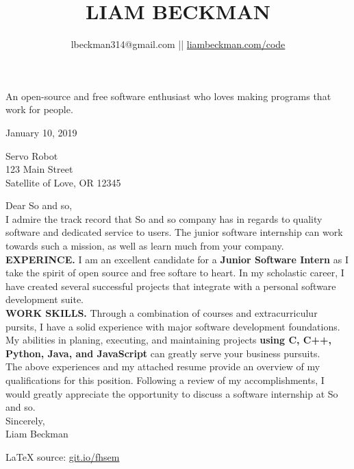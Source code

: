 \documentclass[a4paper]{article}
\title{\textcolor{my-red}{LIAM BECKMAN}}
\author{lbeckman314@gmail.com || \href{https://liambeckman.com/code}{liambeckman.com/code}}
\date{\vspace{-5ex}}
\begin{document}
\maketitle

\begin{center}
An open-source and free software enthusiast who loves making programs that work for people.
\end{center}

\textcolor{my-grey}{\dotfill}
\bigbreak

January 10, 2019\\
\bigbreak

Servo Robot\\
123 Main Street\\
Satellite of Love, OR 12345\\

\bigbreak

Dear So and so,\\

I admire the track record that So and so company has in regards to quality software and dedicated service to users. The junior software internship can work towards such a mission, as well as learn much from your company.\\

\textbf{EXPERINCE.} I am an excellent candidate for a \textbf{Junior Software Intern} as I take the spirit of open source and free softare to heart. In my scholastic career, I have created several successful projects that integrate with a personal software development suite.\\

\textbf{WORK SKILLS.} Through a combination of courses and extracurriculur pursits, I have a solid experience with major software development foundations. My abilities in planing, executing, and maintaining projects \textbf{using C, C++, Python, Java, and JavaScript} can greatly serve your business pursuits.\\

The above experiences and my attached resume provide an overview of my qualifications for this position. Following a review of my accomplishments, I would greatly appreciate the opportunity to discuss a software internship at So and so.\\

Sincerely,\\

Liam Beckman

\vfill

\textcolor{my-grey}{\dotfill}
\medbreak
\hfill\textcolor{my-red}{\LaTeX{} source: \href{https://git.io/fhsem}{git.io/fhsem}}
\end{document}
